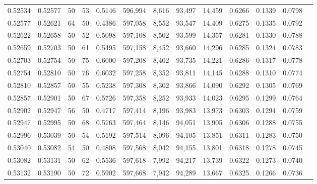 \begin{tabular}{rrrrrrrrrrrrr}
0.52534 & 0.52577 &    50 &  53 &                                     0.5146 & 596,994 &   8,616 &  93,497 &  14,459 & 0.6266 & 0.1339 & 0.0798 \\
0.52577 & 0.52621 &    64 &  50 &                                     0.4386 & 597,058 &   8,552 &  93,547 &  14,409 & 0.6275 & 0.1335 & 0.0792 \\
0.52622 & 0.52658 &    50 &  52 &                                     0.5098 & 597,108 &   8,502 &  93,599 &  14,357 & 0.6281 & 0.1330 & 0.0788 \\
0.52659 & 0.52703 &    50 &  61 &                                     0.5495 & 597,158 &   8,452 &  93,660 &  14,296 & 0.6285 & 0.1324 & 0.0783 \\
0.52703 & 0.52754 &    50 &  75 &                                     0.6000 & 597,208 &   8,402 &  93,735 &  14,221 & 0.6286 & 0.1317 & 0.0778 \\
0.52754 & 0.52810 &    50 &  76 &                                     0.6032 & 597,258 &   8,352 &  93,811 &  14,145 & 0.6288 & 0.1310 & 0.0774 \\
0.52810 & 0.52857 &    50 &  55 &                                     0.5238 & 597,308 &   8,302 &  93,866 &  14,090 & 0.6292 & 0.1305 & 0.0769 \\
0.52857 & 0.52901 &    50 &  67 &                                     0.5726 & 597,358 &   8,252 &  93,933 &  14,023 & 0.6295 & 0.1299 & 0.0764 \\
0.52902 & 0.52947 &    56 &  50 &                                     0.4717 & 597,414 &   8,196 &  93,983 &  13,973 & 0.6303 & 0.1294 & 0.0759 \\
0.52947 & 0.52995 &    50 &  68 &                                     0.5763 & 597,464 &   8,146 &  94,051 &  13,905 & 0.6306 & 0.1288 & 0.0755 \\
0.52996 & 0.53039 &    50 &  54 &                                     0.5192 & 597,514 &   8,096 &  94,105 &  13,851 & 0.6311 & 0.1283 & 0.0750 \\
0.53040 & 0.53082 &    54 &  50 &                                     0.4808 & 597,568 &   8,042 &  94,155 &  13,801 & 0.6318 & 0.1278 & 0.0745 \\
0.53082 & 0.53131 &    50 &  62 &                                     0.5536 & 597,618 &   7,992 &  94,217 &  13,739 & 0.6322 & 0.1273 & 0.0740 \\
0.53132 & 0.53190 &    50 &  72 &                                     0.5902 & 597,668 &   7,942 &  94,289 &  13,667 & 0.6325 & 0.1266 & 0.0736 \\

\end{tabular}
